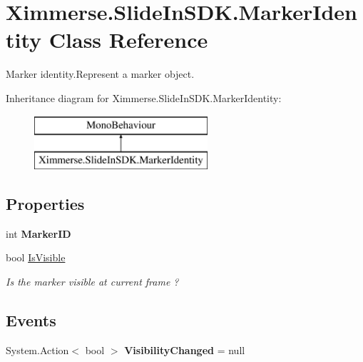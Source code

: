 \hypertarget{class_ximmerse_1_1_slide_in_s_d_k_1_1_marker_identity}{}\section{Ximmerse.\+Slide\+In\+S\+D\+K.\+Marker\+Identity Class Reference}
\label{class_ximmerse_1_1_slide_in_s_d_k_1_1_marker_identity}


Marker identity.\+Represent a marker object.  


Inheritance diagram for Ximmerse.\+Slide\+In\+S\+D\+K.\+Marker\+Identity\+:\begin{figure}[H]
\begin{center}
\leavevmode
\includegraphics[height=2.000000cm]{class_ximmerse_1_1_slide_in_s_d_k_1_1_marker_identity}
\end{center}
\end{figure}
\subsection*{Properties}
\begin{DoxyCompactItemize}
\item 
\mbox{\label{class_ximmerse_1_1_slide_in_s_d_k_1_1_marker_identity_af594040113c145ee03dee2db35310604}} 
int {\bfseries Marker\+ID}
\item 
bool \mbox{\hyperlink{class_ximmerse_1_1_slide_in_s_d_k_1_1_marker_identity_ac9b8916f50e7dd3aa8f8b2a30fab32f2}{Is\+Visible}}
\begin{DoxyCompactList}\small\item\em Is the marker visible at current frame ? \end{DoxyCompactList}\end{DoxyCompactItemize}
\subsection*{Events}
\begin{DoxyCompactItemize}
\item 
\mbox{\label{class_ximmerse_1_1_slide_in_s_d_k_1_1_marker_identity_a13abff3da17f1b249358431570ac3e63}} 
System.\+Action$<$ bool $>$ {\bfseries Visibility\+Changed} = null
\end{DoxyCompactItemize}


